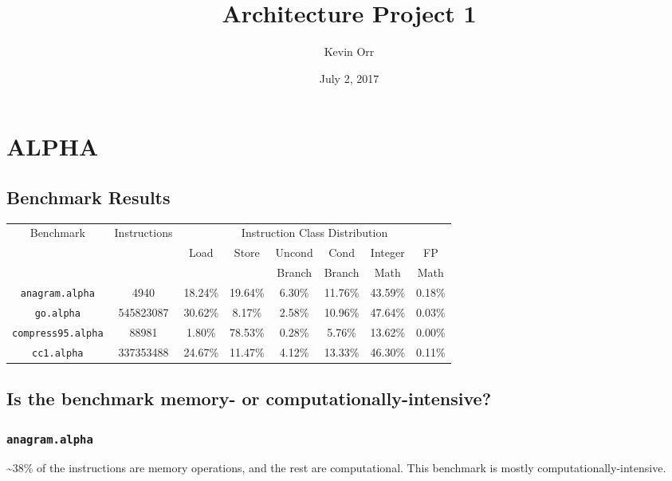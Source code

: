 \documentclass[11pt]{article}
\author{Kevin Orr}
\date{July 2, 2017}
\title{Architecture Project 1}
\begin{document}
\maketitle

\section{ALPHA}
\label{sec:org1ee1864}
\subsection{Benchmark Results}
\label{sec:org14c85d8}
\begin{table}[htb]
\begin{center}
\begin{tabular}{|c|c|c|c|c|c|c|c|}
  \hline
  \multirow{3}{*}{Benchmark} & \multirow{3}{*}{Instructions} & \multicolumn{6}{c|}{Instruction Class Distribution} \\ \cline{3-8}
  & & \multirow{2}{*}{Load} & \multirow{2}{*}{Store} & Uncond & Cond   & Integer  & FP\\
  & &                       &                        & Branch & Branch & Math     & Math \\
  \hline
  \texttt{anagram.alpha} & 4940 & 18.24\% & 19.64\% & 6.30\% & 11.76\% & 43.59\% & 0.18\% \\
  \texttt{go.alpha} & 545823087 & 30.62\% & 8.17\% & 2.58\% & 10.96\% & 47.64\% & 0.03\% \\
  \texttt{compress95.alpha} & 88981 & 1.80\% & 78.53\% & 0.28\% & 5.76\% & 13.62\% & 0.00\% \\
  \texttt{cc1.alpha} & 337353488 & 24.67\% & 11.47\% & 4.12\% & 13.33\% & 46.30\% & 0.11\% \\
  \hline
\end{tabular}
\end{center}
\end{table}

\subsection{Is the benchmark memory- or computationally-intensive?}
\label{sec:org4260b6d}
\subsubsection{\texttt{anagram.alpha}}
\label{sec:orgeca32e3}
\textasciitilde{}38\% of the instructions are memory operations, and the rest are computational. This benchmark is mostly computationally-intensive.
\end{document}
